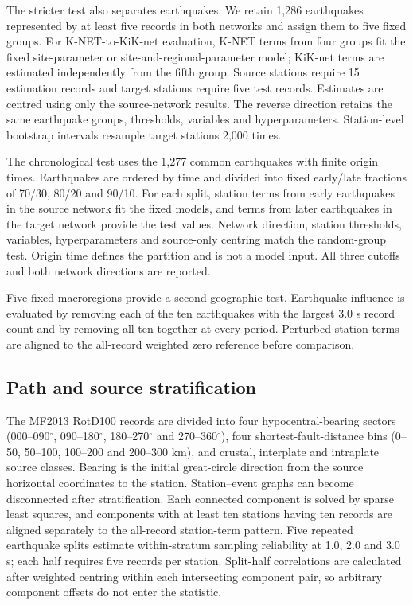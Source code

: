 \documentclass[11pt]{article}
\begin{document}
The stricter test also separates earthquakes. We retain 1,286 earthquakes represented by at least five records in both networks and assign them to five fixed groups. For K-NET-to-KiK-net evaluation, K-NET terms from four groups fit the fixed site-parameter or site-and-regional-parameter model; KiK-net terms are estimated independently from the fifth group. Source stations require 15 estimation records and target stations require five test records. Estimates are centred using only the source-network results. The reverse direction retains the same earthquake groups, thresholds, variables and hyperparameters. Station-level bootstrap intervals resample target stations 2,000 times.

The chronological test uses the 1,277 common earthquakes with finite origin times. Earthquakes are ordered by time and divided into fixed early/late fractions of 70/30, 80/20 and 90/10. For each split, station terms from early earthquakes in the source network fit the fixed models, and terms from later earthquakes in the target network provide the test values. Network direction, station thresholds, variables, hyperparameters and source-only centring match the random-group test. Origin time defines the partition and is not a model input. All three cutoffs and both network directions are reported.

Five fixed macroregions provide a second geographic test. Earthquake influence is evaluated by removing each of the ten earthquakes with the largest 3.0 s record count and by removing all ten together at every period. Perturbed station terms are aligned to the all-record weighted zero reference before comparison.

\subsection{Path and source stratification}

The MF2013 RotD100 records are divided into four hypocentral-bearing sectors (000--090$^\circ$, 090--180$^\circ$, 180--270$^\circ$ and 270--360$^\circ$), four shortest-fault-distance bins (0--50, 50--100, 100--200 and 200--300 km), and crustal, interplate and intraplate source classes. Bearing is the initial great-circle direction from the source horizontal coordinates to the station. Station--event graphs can become disconnected after stratification. Each connected component is solved by sparse least squares, and components with at least ten stations having ten records are aligned separately to the all-record station-term pattern. Five repeated earthquake splits estimate within-stratum sampling reliability at 1.0, 2.0 and 3.0 s; each half requires five records per station. Split-half correlations are calculated after weighted centring within each intersecting component pair, so arbitrary component offsets do not enter the statistic.
\end{document}

